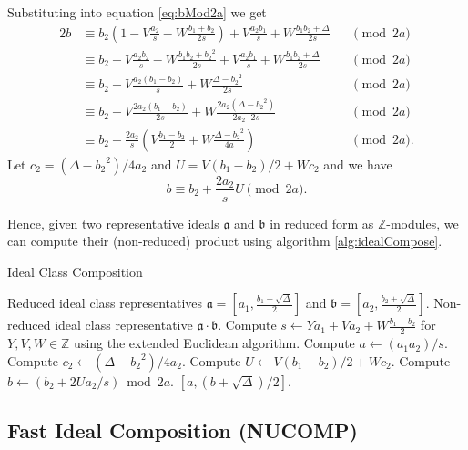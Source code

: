 \documentclass{ucalgthes1}
\theoremstyle{plain}
\theoremstyle{definition}
\newcommand{\ZZ}{\mathbb{Z}}
\begin{document}
\noindent
Substituting into equation \eqref{eq:bMod2a} we get
\begin{alignat*}{2}
	b & \equiv b_2(1-V\frac{a_2}{s} - W\frac{b_1+b_2}{2s}) + V\frac{a_2b_1}{s} + W\frac{b_1b_2 + \Delta}{2s} && \pmod{2a} \\
	& \equiv b_2 - V\frac{a_2b_2}{s} - W\frac{b_1b_2+{b_2}^2}{2s} + V\frac{a_2b_1}{s} + W\frac{b_1b_2 + \Delta}{2s} && \pmod{2a} \\
	& \equiv b_2 + V\frac{a_2(b_1-b_2)}{s} + W\frac{\Delta - {b_2}^2}{2s} && \pmod{2a} \\
	& \equiv b_2 + V\frac{2a_2(b_1-b_2)}{2s} + W\frac{2a_2(\Delta - {b_2}^2)}{2a_2 \cdot 2s} && \pmod{2a} \\
	& \equiv b_2 + \frac{2a_2}{s} \left( V\frac{b_1-b_2}{2} + W\frac{\Delta - {b_2}^2}{4a} \right) && \pmod{2a}.
\end{alignat*}
Let $c_2 = (\Delta - {b_2}^2)/4a_2$ and $U = V(b_1-b_2)/2 + Wc_2$ and we have
\[
	b \equiv b_2 + \frac{2a_2}{s} U \pmod{2a}.
\]

\noindent
Hence, given two representative ideals $\mathfrak a$ and $\mathfrak b$ in reduced form as $\ZZ$-modules, we can compute their (non-reduced) product using algorithm \ref{alg:idealCompose}.

\begin{algorithm}[h]
\caption{Ideal Class Composition}
\label{alg:idealCompose}
\begin{algorithmic}[1]
\REQUIRE Reduced ideal class representatives $\mathfrak a = \left[a_1, \frac{b_1 + \sqrt\Delta}{2}\right]$ and $\mathfrak b = \left[a_2, \frac{b_2 + \sqrt\Delta}{2}\right]$.
\ENSURE Non-reduced ideal class representative $\mathfrak a \cdot \mathfrak b$.
\STATE Compute $s \leftarrow Ya_1 + Va_2 + W\frac{b_1+b_2}{2}$ for $Y, V, W \in \ZZ$ using the extended Euclidean algorithm.
\STATE Compute $a \leftarrow (a_1a_2)/s$.
\STATE Compute $c_2 \leftarrow (\Delta-{b_2}^2)/4a_2$.
\STATE Compute $U \leftarrow V(b_1-b_2)/2 + Wc_2$.
\STATE Compute $b \leftarrow (b_2 + 2Ua_2/s) \bmod{2a}$.
\RETURN $[a, (b + \sqrt\Delta)/2]$.
\end{algorithmic}
\end{algorithm}


\subsection{Fast Ideal Composition (NUCOMP)}\label{subsec:nucomp}
\end{document}
